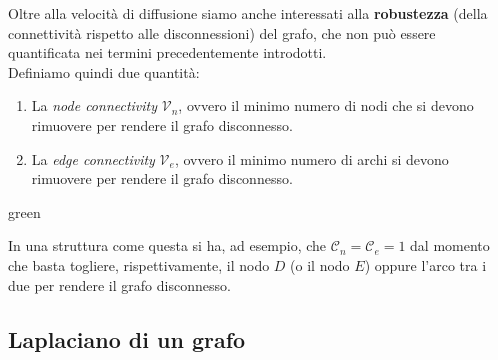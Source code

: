 Oltre alla velocit\`a di diffusione siamo anche interessati alla \textbf{robustezza} (della connettivit\`a rispetto alle disconnessioni) del grafo, che non pu\`o essere quantificata nei termini precedentemente introdotti.\\
Definiamo quindi due quantit\`a:
\begin{enumerate}
    \item La \textit{node connectivity} $\mathcal{V}_n$, ovvero il minimo numero di nodi che si devono rimuovere per rendere il grafo disconnesso.
    \item La \textit{edge connectivity} $\mathcal{V}_e$, ovvero il minimo numero di archi si devono rimuovere per rendere il grafo disconnesso.

\end{enumerate}
\begin{mybox}{green}{}
\begin{minipage}{0.5\textwidth}
\end{minipage}
\begin{minipage}{0.5\textwidth}
In una struttura come questa si ha, ad esempio, che $\mathcal{C}_n = \mathcal{C}_e = 1$ dal momento che basta togliere, rispettivamente, il nodo $D$ (o il nodo $E$) oppure l'arco tra i due per rendere il grafo disconnesso.
\end{minipage}
\end{mybox}

\subsection{Laplaciano di un grafo}

